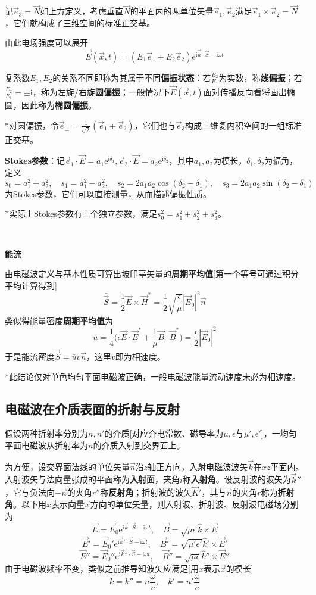 \documentclass[a4paper,UTF8,fontset=windows]{ctexart}
\newcommand*{\er}{\mathrm{e}}
\newcommand*{\ir}{\mathrm{i}}
\newcommand*{\vb}{\vec{B}}
\newcommand*{\ve}{\vec{E}}
\newcommand*{\vh}{\vec{H}}
\newcommand*{\vk}{\vec{K}}
\newcommand*{\vn}{\vec{N}}
\newcommand*{\vs}{\vec{S}}
\newcommand*{\ves}{\vec{e}}
\newcommand*{\vks}{\vec{k}}
\newcommand*{\vns}{\vec{n}}
\newcommand*{\vx}{\vec{x}}
\begin{document}
记$\ves_3=\vn$如上方定义，考虑垂直$\vn$的平面内的两单位矢量$\ves_1,\ves_2$满足$\ves_1\times\ves_2=\vn$，它们就构成了三维空间的标准正交基。

由此电场强度可以展开
$$\ve(\vx,t)=(E_1\ves_1+E_2\ves_2)\er^{\ir\vks\cdot\vx-\ir\omega t}$$

复系数$E_1,E_2$的关系不同即称为其属于不同\textbf{偏振状态}：若$\frac{E_2}{E_1}$为实数，称\textbf{线偏振}；若$\frac{E_2}{E_1}=\pm\ir$，称为左旋/右旋\textbf{圆偏振}；一般情况下$\ve(\vx,t)$面对传播反向看将画出椭圆，因此称为\textbf{椭圆偏振}。

*对圆偏振，令$\ves_\pm=\frac{1}{\sqrt{2}}(\ves_1\pm\ves_2)$，它们也与$\ves_3$构成三维复内积空间的一组标准正交基。

\textbf{Stokes参数}：记$\ves_1\cdot\ve=a_1\er^{\ir\delta_1},\ves_2\cdot\ve=a_2\er^{\ir\delta_2}$，其中$a_1,a_2$为模长，$\delta_1,\delta_2$为辐角，定义
$$s_0=a_1^2+a_2^2,\quad s_1=a_1^2-a_2^2,\quad s_2=2a_1a_2\cos(\delta_2-\delta_1),\quad s_3=2a_1a_2\sin(\delta_2-\delta_1)$$
为Stokes参数，它们可以直接测量，从而描述偏振性质。

*实际上Stokes参数有三个独立参数，满足$s_0^2=s_1^2+s_2^2+s_3^2$。

\

\textbf{能流}

由电磁波定义与基本性质可算出坡印亭矢量的\textbf{周期平均值}[第一个等号可通过积分平均计算得到]
$$\bar{\vs}=\frac{1}{2}\ve\times\vh^*=\frac{1}{2}\sqrt{\frac{\epsilon}{\mu}}|\ve_0|^2\vns$$
类似得能量密度\textbf{周期平均值}为
$$\bar{u}=\frac{1}{4}\bigg(\epsilon\ve\cdot\ve^*+\frac{1}{\mu}\vb\cdot\vb^*\bigg)=\frac{\epsilon}{2}|\ve_0|^2$$
于是能流密度$\bar{\vs}=\bar{u}v\vns$，这里$v$即为相速度。

*此结论仅对单色均匀平面电磁波正确，一般电磁波能量流动速度未必为相速度。

\subsection{电磁波在介质表面的折射与反射}
假设两种折射率分别为$n,n'$的介质[对应介电常数、磁导率为$\mu,\epsilon$与$\mu',\epsilon'$]，一均匀平面电磁波从折射率为$n$的介质入射到交界面上。

为方便，设交界面法线的单位矢量$\vns$沿$z$轴正方向，入射电磁波波矢$\vks$在$xz$平面内。入射波矢与法向量张成的平面称为\textbf{入射面}，夹角$i$称\textbf{入射角}。设反射波的波矢为$\vks''$，它与负法向$-\vns$的夹角$r''$称\textbf{反射角}；折射波的波矢$\vk'$，其与$\vns$的夹角$r$称为\textbf{折射角}。以下用$\hat{x}$表示向量$\vx$方向的单位矢量，则入射波、折射波、反射波电磁场分别为
$$\ve=\ve_0\er^{\ir\vks\cdot\vs-\ir\omega t},\quad\vb=\sqrt{\mu\epsilon}\hat{k}\times\ve$$
$$\ve'=\ve_0'\er^{\ir\vks'\cdot\vs-\ir\omega t},\quad\vb'=\sqrt{\mu'\epsilon'}\hat{k}'\times\ve'$$
$$\ve''=\ve_0''\er^{\ir\vks''\cdot\vs-\ir\omega t},\quad\vb''=\sqrt{\mu\epsilon}\hat{k}''\times\ve''$$
由于电磁波频率不变，类似之前推导知波矢应满足[用$x$表示$\vx$的模长]
$$k=k''=n\frac{\omega}{c},\quad k'=n'\frac{\omega}{c}$$
\end{document}
